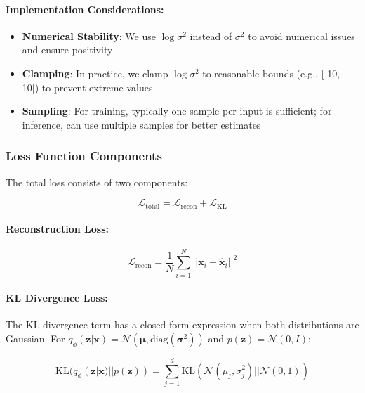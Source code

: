 \documentclass[conference]{IEEEtran}
\newcommand{\logvar}{\log \sigma^2}
\begin{document}
\paragraph{Implementation Considerations:}
\begin{itemize}
    \item \textbf{Numerical Stability}: We use $\logvar$ instead of $\sigma^2$ to avoid numerical issues and ensure positivity
    \item \textbf{Clamping}: In practice, we clamp $\logvar$ to reasonable bounds (e.g., [-10, 10]) to prevent extreme values
    \item \textbf{Sampling}: For training, typically one sample per input is sufficient; for inference, can use multiple samples for better estimates
\end{itemize}

\subsubsection{Loss Function Components}

The total loss consists of two components:

\begin{equation}
\mathcal{L}_{\text{total}} = \mathcal{L}_{\text{recon}} + \mathcal{L}_{\text{KL}}
\end{equation}

\paragraph{Reconstruction Loss:}
\begin{equation}
\mathcal{L}_{\text{recon}} = \frac{1}{N} \sum_{i=1}^{N} ||\mathbf{x}_i - \hat{\mathbf{x}}_i||^2
\end{equation}

\paragraph{KL Divergence Loss:}
The KL divergence term has a closed-form expression when both distributions are Gaussian. For $q_\phi(\mathbf{z}|\mathbf{x}) = \mathcal{N}(\boldsymbol{\mu}, \text{diag}(\boldsymbol{\sigma}^2))$ and $p(\mathbf{z}) = \mathcal{N}(0, I)$:

\begin{equation}
\text{KL}(q_\phi(\mathbf{z}|\mathbf{x}) || p(\mathbf{z})) = \sum_{j=1}^{d} \text{KL}(\mathcal{N}(\mu_j, \sigma_j^2) || \mathcal{N}(0, 1))
\end{equation}
\end{document}
